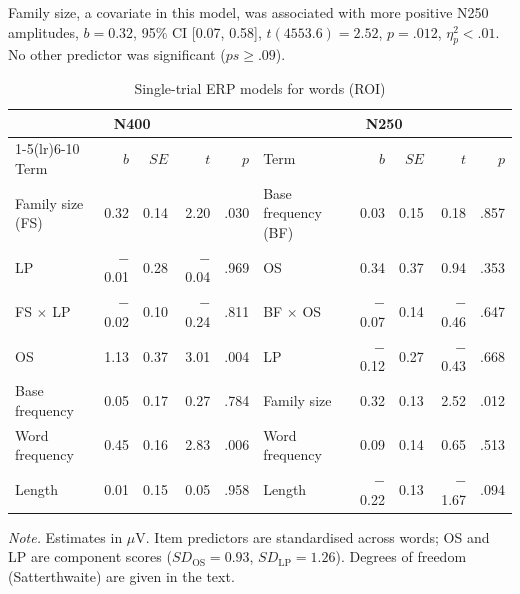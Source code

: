 Family size, a covariate in this model, was associated with more positive N250
amplitudes, $b = 0.32$, 95\% CI [0.07, 0.58], $t(4553.6) = 2.52$, $p = .012$,
$\eta^2_p < .01$. No other predictor was significant ($ps \geq .09$).

\begin{table}[htbp]
\centering
\caption{Single-trial ERP models for words (ROI)}
\label{tab:words}
\begin{tabular}{lrrrr@{\hspace{2em}}lrrrr}
\toprule
\multicolumn{5}{c}{N400} & \multicolumn{5}{c}{N250} \\
\cmidrule(lr){1-5}\cmidrule(lr){6-10}
Term & $b$ & $SE$ & $t$ & $p$ & Term & $b$ & $SE$ & $t$ & $p$ \\
\midrule
Family size (FS)  &  0.32 & 0.14 &  2.20 & .030 & Base frequency (BF) &  0.03 & 0.15 &  0.18 & .857 \\
LP                & $-$0.01 & 0.28 & $-$0.04 & .969 & OS                  &  0.34 & 0.37 &  0.94 & .353 \\
FS $\times$ LP    & $-$0.02 & 0.10 & $-$0.24 & .811 & BF $\times$ OS      & $-$0.07 & 0.14 & $-$0.46 & .647 \\
OS                &  1.13 & 0.37 &  3.01 & .004 & LP                  & $-$0.12 & 0.27 & $-$0.43 & .668 \\
Base frequency    &  0.05 & 0.17 &  0.27 & .784 & Family size         &  0.32 & 0.13 &  2.52 & .012 \\
Word frequency    &  0.45 & 0.16 &  2.83 & .006 & Word frequency      &  0.09 & 0.14 &  0.65 & .513 \\
Length            &  0.01 & 0.15 &  0.05 & .958 & Length              & $-$0.22 & 0.13 & $-$1.67 & .094 \\
\bottomrule
\end{tabular}

\vspace{2pt}
\begin{minipage}{0.95\linewidth}\footnotesize
\textit{Note.} Estimates in $\mu$V. Item predictors are standardised across words;
OS and LP are component scores ($SD_{\text{OS}} = 0.93$, $SD_{\text{LP}} = 1.26$).
Degrees of freedom (Satterthwaite) are given in the text.
\end{minipage}
\end{table}


